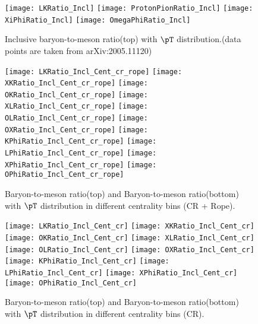 \begin{figure}[ht]
        \begin{center}
                \texttt{[image: LKRatio\_Incl]}
                \texttt{[image: ProtonPionRatio\_Incl]}
                \texttt{[image: XiPhiRatio\_Incl]}
                \texttt{[image: OmegaPhiRatio\_Incl]}
        \end{center}
	\caption{Inclusive baryon-to-meson ratio(top) with $\pT$ distribution.(data points are taken from arXiv:2005.11120)}
        \label{fig:InclBtMratio}
\end{figure}

\begin{figure}[ht]
        \begin{center}
                \texttt{[image: LKRatio\_Incl\_Cent\_cr\_rope]}
                \texttt{[image: XKRatio\_Incl\_Cent\_cr\_rope]}
                \texttt{[image: OKRatio\_Incl\_Cent\_cr\_rope]}
                \texttt{[image: XLRatio\_Incl\_Cent\_cr\_rope]}
                \texttt{[image: OLRatio\_Incl\_Cent\_cr\_rope]}
                \texttt{[image: OXRatio\_Incl\_Cent\_cr\_rope]}
                \texttt{[image: KPhiRatio\_Incl\_Cent\_cr\_rope]}
                \texttt{[image: LPhiRatio\_Incl\_Cent\_cr\_rope]}
                \texttt{[image: XPhiRatio\_Incl\_Cent\_cr\_rope]}
                \texttt{[image: OPhiRatio\_Incl\_Cent\_cr\_rope]}
        \end{center}
	\caption{Baryon-to-meson ratio(top) and Baryon-to-meson ratio(bottom) with $\pT$ distribution in different centrality bins (CR + Rope).}
        \label{fig:InclParRatioCentcrandrope}
\end{figure}

\begin{figure}[ht]
	\begin{center}
		\texttt{[image: LKRatio\_Incl\_Cent\_cr]}
		\texttt{[image: XKRatio\_Incl\_Cent\_cr]}
		\texttt{[image: OKRatio\_Incl\_Cent\_cr]}
		\texttt{[image: XLRatio\_Incl\_Cent\_cr]}
		\texttt{[image: OLRatio\_Incl\_Cent\_cr]}
		\texttt{[image: OXRatio\_Incl\_Cent\_cr]}
                \texttt{[image: KPhiRatio\_Incl\_Cent\_cr]}
                \texttt{[image: LPhiRatio\_Incl\_Cent\_cr]}
                \texttt{[image: XPhiRatio\_Incl\_Cent\_cr]}
                \texttt{[image: OPhiRatio\_Incl\_Cent\_cr]}
	\end{center}
	\caption{Baryon-to-meson ratio(top) and Baryon-to-meson ratio(bottom) with $\pT$ distribution in different centrality bins (CR).}
	\label{fig:InclParRatioCentcr}
\end{figure}

